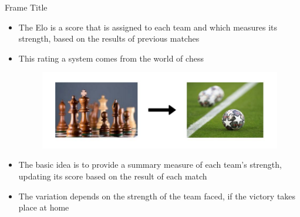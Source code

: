 \documentclass[aspectratio=169,xcolor=dvipsnames]{beamer}
\begin{document}
\begin{frame}{Frame Title}
\begin{itemize}

    \item  The Elo is a score that is assigned to each team and which measures its strength, based on the results of previous matches
    
    \item This rating a system comes from the world of chess
    
    \begin{figure}[ht] 
        \begin{center} 
            \includegraphics[width=12cm]{fre.jpg}\\
        \end{center} 
    \end{figure}
    
    \item The basic idea is to provide a summary measure of each team's strength, updating its score based on the result of each match
    
    \item The variation depends on the strength of the team faced, if the victory takes place at home
\end{itemize}
\end{frame}

\end{document}
